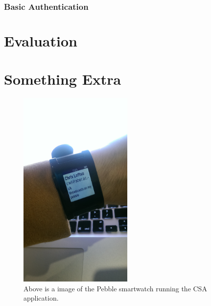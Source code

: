 \documentclass{article}
\begin{document}
\subsubsection{Basic Authentication}

\newpage
\section{Evaluation}

\newpage
\section{Something Extra}
\begin{figure}[H]
\centering
\includegraphics[width=0.5\textwidth]{pebble}
\caption{Above is a image of the Pebble smartwatch running the CSA application.}
\end{figure}
\end{document}
